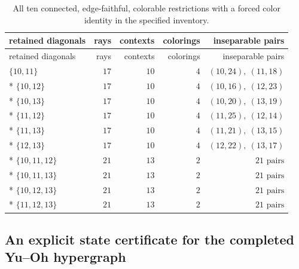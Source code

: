 \documentclass[aps,pra,reprint,superscriptaddress,longbibliography,nofootinbib,floatfix,10pt]{revtex4-2}
\theoremstyle{definition}
\begin{document}
\begingroup\small\setlength{\LTpre}{6pt}\setlength{\LTpost}{8pt}
\begin{longtable}{lrrrr}
\caption{All ten connected, edge-faithful, colorable restrictions with a forced color identity in the specified inventory.}\label{tab:inventory}\\
\toprule retained diagonals & rays & contexts & colorings & inseparable pairs\\\midrule
\endfirsthead
\toprule retained diagonals & rays & contexts & colorings & inseparable pairs\\\midrule
\endhead
\bottomrule\endfoot
$\{10,11\}$ & $17$ & $10$ & $4$ & $(10,24),\ (11,18)$ \\*
$\{10,12\}$ & $17$ & $10$ & $4$ & $(10,16),\ (12,23)$ \\*
$\{10,13\}$ & $17$ & $10$ & $4$ & $(10,20),\ (13,19)$ \\*
$\{11,12\}$ & $17$ & $10$ & $4$ & $(11,25),\ (12,14)$ \\*
$\{11,13\}$ & $17$ & $10$ & $4$ & $(11,21),\ (13,15)$ \\*
$\{12,13\}$ & $17$ & $10$ & $4$ & $(12,22),\ (13,17)$ \\*
$\{10,11,12\}$ & $21$ & $13$ & $2$ & $21\text{ pairs}$ \\*
$\{10,11,13\}$ & $21$ & $13$ & $2$ & $21\text{ pairs}$ \\*
$\{10,12,13\}$ & $21$ & $13$ & $2$ & $21\text{ pairs}$ \\*
$\{11,12,13\}$ & $21$ & $13$ & $2$ & $21\text{ pairs}$ \\
\end{longtable}\endgroup


\FloatBarrier
\subsection{An explicit state certificate for the completed Yu--Oh hypergraph}
\label{m:app:states}
\end{document}
